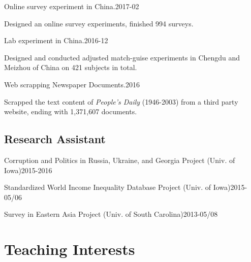\documentclass[10.5pt,]{article}
\providecommand{\tightlist}{%
	\setlength{\itemsep}{0pt}\setlength{\parskip}{0pt}}
\renewenvironment{itemize}{
	\begin{list}{}{
			\setlength{\leftmargin}{1.5em}
		}
	}{
	\end{list}
}
\begin{document}
\begin{itemize}
\tightlist
\item
  Online survey experiment in China.\hfill 2017-02

  \begin{itemize}
  \tightlist
  \item
    \footnotesize Designed an online survey experiments, finished 994
    surveys.
  \end{itemize}
\item
  Lab experiment in China.\hfill 2016-12

  \begin{itemize}
  \tightlist
  \item
    \footnotesize Designed and conducted adjusted match-guise
    experiments in Chengdu and Meizhou of China on 421 subjects in
    total.
  \end{itemize}
\item
  Web scrapping Newspaper Documents.\hfill 2016

  \begin{itemize}
  \tightlist
  \item
    \footnotesize Scrapped the text content of \emph{People's Daily}
    (1946-2003) from a third party website, ending with 1,371,607
    documents.
  \end{itemize}
\end{itemize}

\subsection{Research Assistant}\label{research-assistant}

\begin{itemize}
\tightlist
\item
  Corruption and Politics in Russia, Ukraine, and Georgia Project (Univ.
  of Iowa)\hfill 2015-2016
\item
  Standardized World Income Inequality Database Project (Univ. of
  Iowa)\hfill 2015-05/06
\item
  Survey in Eastern Asia Project (Univ. of South
  Carolina)\hfill 2013-05/08
\end{itemize}

\section{Teaching Interests}\label{teaching-interests}
\end{document}
